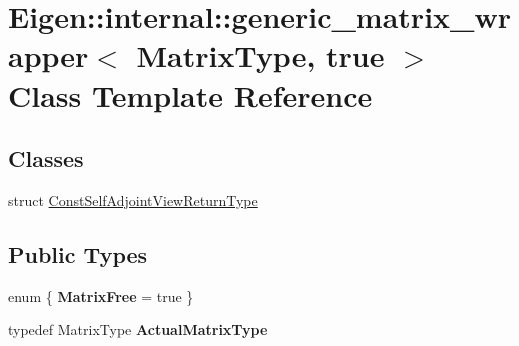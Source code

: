 \hypertarget{class_eigen_1_1internal_1_1generic__matrix__wrapper_3_01_matrix_type_00_01true_01_4}{}\section{Eigen\+::internal\+::generic\+\_\+matrix\+\_\+wrapper$<$ Matrix\+Type, true $>$ Class Template Reference}
\label{class_eigen_1_1internal_1_1generic__matrix__wrapper_3_01_matrix_type_00_01true_01_4}
\subsection*{Classes}
\begin{DoxyCompactItemize}
\item 
struct \mbox{\hyperlink{struct_eigen_1_1internal_1_1generic__matrix__wrapper_3_01_matrix_type_00_01true_01_4_1_1_const_self_adjoint_view_return_type}{Const\+Self\+Adjoint\+View\+Return\+Type}}
\end{DoxyCompactItemize}
\subsection*{Public Types}
\begin{DoxyCompactItemize}
\item 
\mbox{\label{class_eigen_1_1internal_1_1generic__matrix__wrapper_3_01_matrix_type_00_01true_01_4_aff94b630d24e1db3516526deee9dc638}} 
enum \{ {\bfseries Matrix\+Free} = true
 \}
\item 
\mbox{\label{class_eigen_1_1internal_1_1generic__matrix__wrapper_3_01_matrix_type_00_01true_01_4_ad31c6c1566df071cba1c91589b586cc7}} 
typedef Matrix\+Type {\bfseries Actual\+Matrix\+Type}
\end{DoxyCompactItemize}
